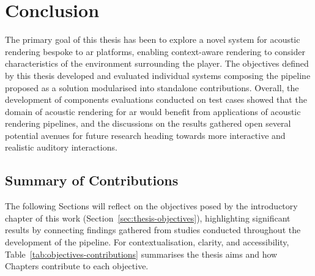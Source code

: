 \chapter{Conclusion}\label{ch:conclusion}
The primary goal of this thesis has been to explore a novel system for acoustic rendering bespoke to \acrshort{ar} platforms, enabling context-aware rendering to consider characteristics of the environment surrounding the player. The objectives defined by this thesis developed and evaluated individual systems composing the pipeline proposed as a solution modularised into standalone contributions. Overall, the development of components evaluations conducted on test cases showed that the domain of acoustic rendering for \acrshort{ar} would benefit from applications of acoustic rendering pipelines, and the discussions on the results gathered open several potential avenues for future research heading towards more interactive and realistic auditory interactions.

\section{Summary of Contributions}
The following Sections will reflect on the objectives posed by the introductory chapter of this work (Section~\ref{sec:thesis-objectives}), highlighting significant results by connecting findings gathered from studies conducted throughout the development of the pipeline. For contextualisation, clarity, and accessibility, Table~\ref{tab:objectives-contributions} summarises the thesis aims and how Chapters contribute to each objective.



